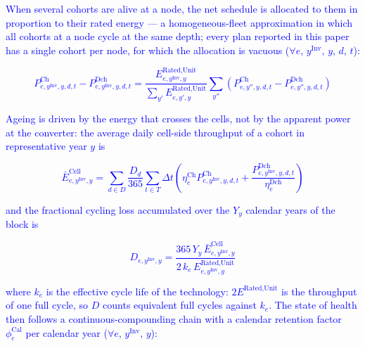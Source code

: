\documentclass[preprint,12pt]{elsarticle}
\begin{document}
\textcolor{blue}{When several cohorts are alive at a node, the net schedule is allocated to them in proportion to their rated energy --- a homogeneous-fleet approximation in which all cohorts at a node cycle at the same depth; every plan reported in this paper has a single cohort per node, for which the allocation is vacuous ($\forall e$, $y^\text{Inv}$, $y$, $d$, $t$):}

\textcolor{blue}{
    \begin{equation}
        P^{\text{Ch}}_{e,y^\text{Inv},y,d,t} - P^{\text{Dch}}_{e,y^\text{Inv},y,d,t} =
        \frac{E^{\text{Rated,Unit}}_{e,y^\text{Inv},y}}{\sum_{y'} E^{\text{Rated,Unit}}_{e,y',y}}
        \sum_{y''} \left( P^{\text{Ch}}_{e,y'',y,d,t} - P^{\text{Dch}}_{e,y'',y,d,t} \right)
        \label{eq:cohort_allocation}
    \end{equation}
}

\textcolor{blue}{Ageing is driven by the energy that crosses the cells, not by the apparent power at the
converter: the average daily cell-side throughput of a cohort in representative year $y$ is}

\textcolor{blue}{
    \begin{equation}
        \bar{E}^{\text{Cell}}_{e,y^\text{Inv},y} =
        \sum_{d \in D} \frac{D_d}{365} \sum_{t \in T} \Delta t
        \left(
            \eta^{\text{Ch}}_e P^{\text{Ch}}_{e,y^\text{Inv},y,d,t}
            +
            \frac{P^{\text{Dch}}_{e,y^\text{Inv},y,d,t}}{\eta^{\text{Dch}}_e}
        \right)
        \label{eq:cell_throughput}
    \end{equation}
}

\textcolor{blue}{and the fractional cycling loss accumulated over the $Y_y$ calendar years of the block is}

\textcolor{blue}{
    \begin{equation}
        D_{e,y^\text{Inv},y} =
        \frac{365 \, Y_y \, \bar{E}^{\text{Cell}}_{e,y^\text{Inv},y}}
             {2 \, k_e \, E^{\text{Rated,Unit}}_{e,y^\text{Inv},y}}
        \label{eq:cycling_loss}
    \end{equation}
}

\noindent
\textcolor{blue}{where $k_e$ is the effective cycle life of the technology: $2 E^{\text{Rated,Unit}}$ is the throughput of one full cycle, so $D$ counts equivalent full cycles against $k_e$. The state of health then follows a continuous-compounding chain with a calendar retention factor $\phi^{\text{Cal}}_e$ per calendar year ($\forall e$, $y^\text{Inv}$, $y$):}
\end{document}
